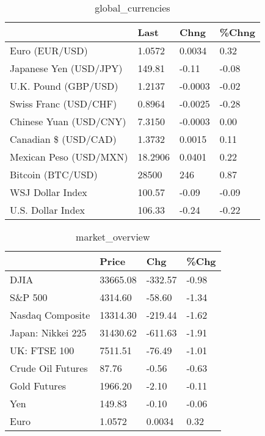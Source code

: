\documentclass{article}%
\begin{document}
%


\begin{table}[htbp]%
\caption{global\_currencies}%
\centering%
\begin{adjustbox}{width=1\textwidth}%
\begin{tabular}{llll}
\toprule
                       &    Last &    Chng & \%Chng \\
\midrule
        Euro (EUR/USD) &  1.0572 &  0.0034 &  0.32 \\
Japanese Yen (USD/JPY) &  149.81 &   -0.11 & -0.08 \\
  U.K. Pound (GBP/USD) &  1.2137 & -0.0003 & -0.02 \\
 Swiss Franc (USD/CHF) &  0.8964 & -0.0025 & -0.28 \\
Chinese Yuan (USD/CNY) &  7.3150 & -0.0003 &  0.00 \\
  Canadian \$ (USD/CAD) &  1.3732 &  0.0015 &  0.11 \\
Mexican Peso (USD/MXN) & 18.2906 &  0.0401 &  0.22 \\
     Bitcoin (BTC/USD) &   28500 &     246 &  0.87 \\
      WSJ Dollar Index &  100.57 &   -0.09 & -0.09 \\
     U.S. Dollar Index &  106.33 &   -0.24 & -0.22 \\
\bottomrule
\end{tabular}
%
\end{adjustbox}%
\end{table}

%


\begin{table}[htbp]%
\caption{market\_overview}%
\centering%
\begin{adjustbox}{width=1\textwidth}%
\begin{tabular}{llll}
\toprule
                  &    Price &     Chg &  \%Chg \\
\midrule
             DJIA & 33665.08 & -332.57 & -0.98 \\
          S\&P 500 &  4314.60 &  -58.60 & -1.34 \\
 Nasdaq Composite & 13314.30 & -219.44 & -1.62 \\
Japan: Nikkei 225 & 31430.62 & -611.63 & -1.91 \\
     UK: FTSE 100 &  7511.51 &  -76.49 & -1.01 \\
Crude Oil Futures &    87.76 &   -0.56 & -0.63 \\
     Gold Futures &  1966.20 &   -2.10 & -0.11 \\
              Yen &   149.83 &   -0.10 & -0.06 \\
             Euro &   1.0572 &  0.0034 &  0.32 \\
\bottomrule
\end{tabular}
%
\end{adjustbox}%
\end{table}

%
\end{document}
